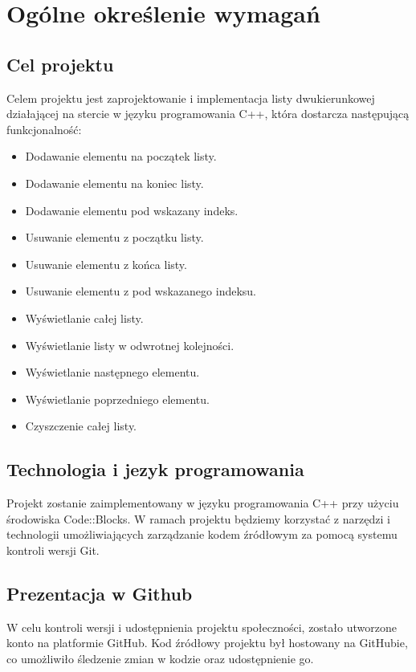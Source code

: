\newpage
\section{Ogólne określenie wymagań}	%
\subsection{Cel projektu} %
\hspace{0.60cm}Celem projektu jest zaprojektowanie i implementacja listy dwukierunkowej działającej na stercie w języku programowania C++, która dostarcza następującą funkcjonalność:

\begin{itemize}
    \item Dodawanie elementu na początek listy.
    \item Dodawanie elementu na koniec listy.
    \item Dodawanie elementu pod wskazany indeks.
    \item Usuwanie elementu z początku listy.
    \item Usuwanie elementu z końca listy.
    \item Usuwanie elementu z pod wskazanego indeksu.
    \item Wyświetlanie całej listy.
    \item Wyświetlanie listy w odwrotnej kolejności.
    \item Wyświetlanie następnego elementu.
    \item Wyświetlanie poprzedniego elementu.
    \item Czyszczenie całej listy.
\end{itemize}


\subsection{Technologia i jezyk programowania}  %

\hspace{0.60cm}Projekt zostanie zaimplementowany w języku programowania C++ przy użyciu środowiska Code::Blocks. W ramach projektu będziemy korzystać z narzędzi i technologii umożliwiających zarządzanie kodem źródłowym za pomocą systemu kontroli wersji Git.



\subsection{Prezentacja w Github}  %

\hspace{0.60cm}W celu kontroli wersji i udostępnienia projektu społeczności, zostało utworzone konto na platformie GitHub. Kod źródłowy projektu był hostowany na GitHubie, co umożliwiło śledzenie zmian w kodzie oraz udostępnienie go.

 
 
 
 
 